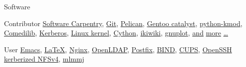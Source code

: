 \begin{vita}
\begin{cv}{}
\begin{cvlist}{Software}
  \item[Contributor]
    \href{http://software-carpentry.org/}{Software Carpentry},
    \href{http://git-scm.com/}{Git},
    \href{http://docs.getpelican.com/}{Pelican},
    \href{http://www.gentoo.org/proj/en/releng/catalyst/}{Gentoo catalyst},
    \href{https://github.com/agrover/python-kmod}{python-kmod},
    \href{http://www.comedi.org/}{Comedilib},
    \href{http://web.mit.edu/kerberos/}{Kerberos},
    \href{http://www.kernel.org/}{Linux kernel},
    \href{http://www.cython.org/}{Cython},
    \href{http://ikiwiki.info/}{ikiwiki},
    \href{http://www.gnuplot.info/}{gnuplot},
    \href{https://github.com/wking}{and}
    \href{http://www.ohloh.net/accounts/wking}{more}
    \href{http://blog.tremily.us/posts/Bugs/}{\ldots}
  \item[User]
    \href{http://www.gnu.org/software/emacs/}{Emacs},
    \href{http://www.latex-project.org/}{\LaTeX},
    \href{http://nginx.org/}{Nginx},
    \href{http://www.openldap.org/}{OpenLDAP},
    \href{http://www.postfix.org/}{Postfix},
    \href{https://www.isc.org/software/bind}{BIND},
    \href{http://www.cups.org/}{CUPS},
    \href{http://www.openssh.org/}{OpenSSH}
    \href{http://en.wikipedia.org/wiki/Network_File_System#NFSv4}{kerberized
      NFSv4},
    \href{http://mlmmj.org/}{mlmmj}
  \end{cvlist}

  \date{}
\end{cv}

\end{vita}
